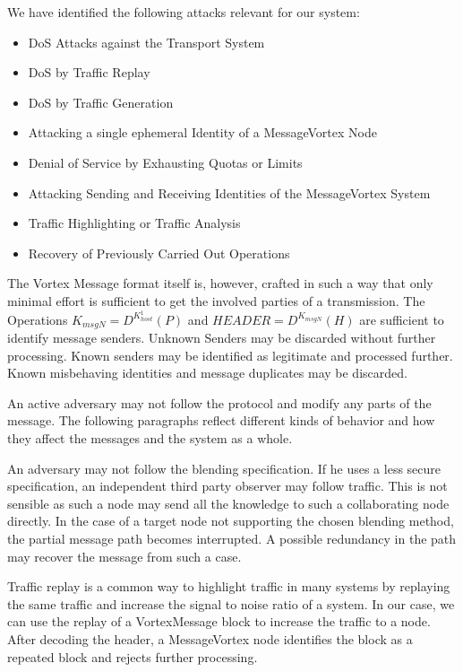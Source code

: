 We have identified the following attacks relevant for our system:
\begin{itemize}
	\item DoS Attacks against the Transport System
	\item DoS by Traffic Replay
	\item DoS by Traffic Generation
	\item Attacking a single ephemeral Identity of a MessageVortex Node
	\item Denial of Service by Exhausting Quotas or Limits
	\item Attacking Sending and Receiving Identities of the MessageVortex System
	\item Traffic Highlighting or Traffic Analysis
	\item Recovery of Previously Carried Out Operations
\end{itemize}

The Vortex Message format itself is, however, crafted in such a way that only minimal effort is sufficient to get the involved parties of a transmission. The Operations $ K_{msgN}=D^{K^{1}_{host}}\left(P\right)$ and $HEADER=D^{K_{msgN}}\left(H\right)$ are sufficient to identify message senders. Unknown Senders may be discarded without further processing. Known senders may be identified as legitimate and processed further. Known misbehaving identities and message duplicates may be discarded. 

An active adversary may not follow the protocol and modify any parts of the message. The following paragraphs reflect different kinds of behavior and how they affect the messages and the system as a whole.

An adversary may not follow the blending specification. If he uses a less secure specification, an independent third party observer may follow traffic. This is not sensible as such a node may send all the knowledge to such a collaborating node directly. In the case of a  target node not supporting the chosen blending method, the partial message path becomes interrupted. A possible redundancy in the path may recover the message from such a case.

Traffic replay is a common way to highlight traffic in many systems by replaying the same traffic and increase the signal to noise ratio of a system. In our case, we can use the replay of a VortexMessage block to increase the traffic to a node. After decoding the header, a MessageVortex node identifies the block as a repeated block and rejects further processing. 

